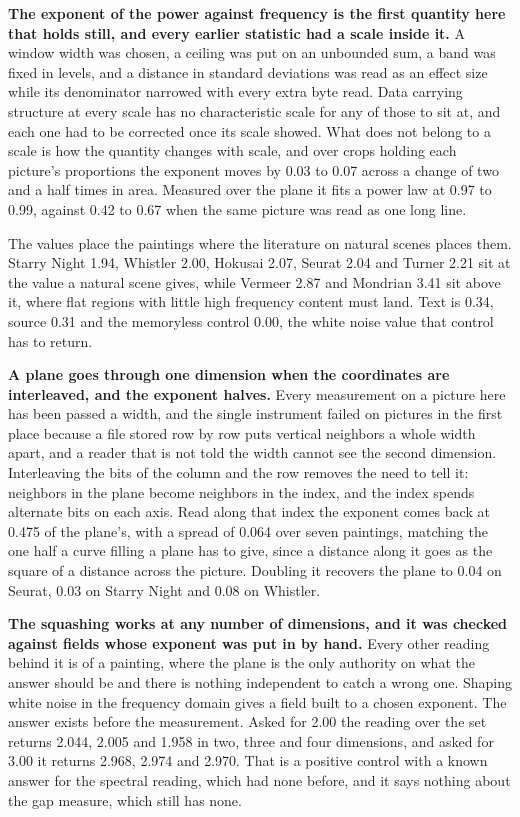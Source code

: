 \textbf{The exponent of the power against frequency is the first quantity here that holds still, and every earlier statistic had a scale inside it.} A window width was chosen, a ceiling was put on an unbounded sum, a band was fixed in levels, and a distance in standard deviations was read as an effect size while its denominator narrowed with every extra byte read. Data carrying structure at every scale has no characteristic scale for any of those to sit at, and each one had to be corrected once its scale showed. What does not belong to a scale is how the quantity changes with scale, and over crops holding each picture's proportions the exponent moves by 0.03 to 0.07 across a change of two and a half times in area. Measured over the plane it fits a power law at 0.97 to 0.99, against 0.42 to 0.67 when the same picture was read as one long line.

The values place the paintings where the literature on natural scenes places them. Starry Night 1.94, Whistler 2.00, Hokusai 2.07, Seurat 2.04 and Turner 2.21 sit at the value a natural scene gives, while Vermeer 2.87 and Mondrian 3.41 sit above it, where flat regions with little high frequency content must land. Text is 0.34, source 0.31 and the memoryless control 0.00, the white noise value that control has to return.

\textbf{A plane goes through one dimension when the coordinates are interleaved, and the exponent halves.} Every measurement on a picture here has been passed a width, and the single instrument failed on pictures in the first place because a file stored row by row puts vertical neighbors a whole width apart, and a reader that is not told the width cannot see the second dimension. Interleaving the bits of the column and the row removes the need to tell it: neighbors in the plane become neighbors in the index, and the index spends alternate bits on each axis. Read along that index the exponent comes back at 0.475 of the plane's, with a spread of 0.064 over seven paintings, matching the one half a curve filling a plane has to give, since a distance along it goes as the square of a distance across the picture. Doubling it recovers the plane to 0.04 on Seurat, 0.03 on Starry Night and 0.08 on Whistler.

\textbf{The squashing works at any number of dimensions, and it was checked against fields whose exponent was put in by hand.} Every other reading behind it is of a painting, where the plane is the only authority on what the answer should be and there is nothing independent to catch a wrong one. Shaping white noise in the frequency domain gives a field built to a chosen exponent. The answer exists before the measurement. Asked for 2.00 the reading over the set returns 2.044, 2.005 and 1.958 in two, three and four dimensions, and asked for 3.00 it returns 2.968, 2.974 and 2.970. That is a positive control with a known answer for the spectral reading, which had none before, and it says nothing about the gap measure, which still has none.

